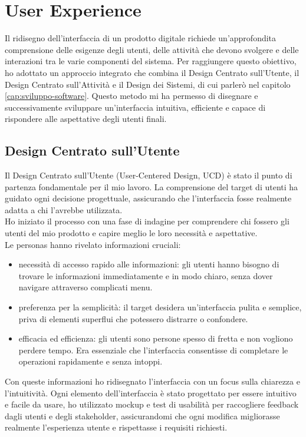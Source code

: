 \chapter{User Experience }
\label{cap:user-experience}

Il ridisegno dell'interfaccia di un prodotto digitale richiede un'approfondita comprensione delle esigenze degli utenti, delle attività che devono svolgere e delle interazioni tra le varie componenti del sistema. Per raggiungere questo obiettivo, ho adottato un approccio integrato che combina il Design Centrato sull'Utente, il Design Centrato sull'Attività e il Design dei Sistemi, di cui parlerò nel capitolo \ref{cap:sviluppo-software}. Questo metodo mi ha permesso di disegnare e successivamente sviluppare un'interfaccia intuitiva, efficiente e capace di rispondere alle aspettative degli utenti finali.

\section{Design Centrato sull'Utente}

Il Design Centrato sull'Utente (User-Centered Design, UCD) è stato il punto di partenza fondamentale per il mio lavoro. La comprensione del target di utenti ha guidato ogni decisione progettuale, assicurando che l'interfaccia fosse realmente adatta a chi l'avrebbe utilizzata.\\
Ho iniziato il processo con una fase di indagine per comprendere chi fossero gli utenti del mio prodotto e capire meglio le loro necessità e aspettative.\\

Le personas hanno rivelato informazioni cruciali:
\begin{itemize}
    \item necessità di accesso rapido alle informazioni: gli utenti hanno bisogno di trovare le informazioni immediatamente e in modo chiaro, senza dover navigare attraverso complicati menu.
    \item preferenza per la semplicità: il target desidera un'interfaccia pulita e semplice, priva di elementi superflui che potessero distrarre o confondere.
    \item efficacia ed efficienza: gli utenti sono persone spesso di fretta e non vogliono perdere tempo. Era essenziale che l'interfaccia consentisse di completare le operazioni rapidamente e senza intoppi.
\end{itemize}

Con queste informazioni ho ridisegnato l'interfaccia con un focus sulla chiarezza e l'intuitività. Ogni elemento dell'interfaccia è stato progettato per essere intuitivo e facile da usare, ho utilizzato mockup e test di usabilità per raccogliere feedback dagli utenti e degli stakeholder, assicurandomi che ogni modifica migliorasse realmente l'esperienza utente e rispettasse i requisiti richiesti.

